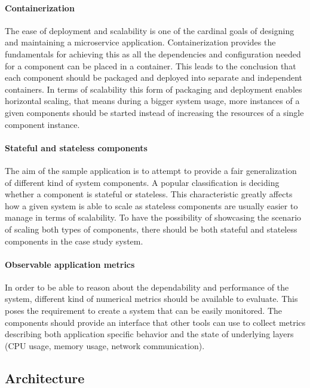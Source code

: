 \paragraph{Containerization}The ease of deployment and scalability is one of the cardinal goals of designing and maintaining a microservice application. Containerization provides the fundamentals for achieving this as all the dependencies and configuration needed for a component can be placed in a container. This leads to the conclusion that each component should be packaged and deployed into separate and independent containers.  In terms of scalability this form of packaging and deployment enables horizontal scaling, that means \eg during a bigger system usage, more instances of a given components should be started instead of increasing the resources of a single component instance.

\paragraph{Stateful and stateless components}The aim of the sample application is to attempt to provide a fair generalization of different kind of system components. A popular classification is deciding whether a component is stateful or stateless. This characteristic greatly affects how a given system is able to scale as stateless components are usually easier to manage in terms of scalability. To have the possibility of showcasing the scenario of scaling both types of components, there should be both stateful and stateless components in the case study system.

\paragraph{Observable application metrics}In order to be able to reason about the dependability and performance of the system, different kind of numerical metrics should be available to evaluate. This poses the requirement to create a system that can be easily monitored. The 
components should provide an interface that other tools can use to collect metrics describing both application specific behavior and the state of underlying layers (\eg CPU usage, memory usage, network communication).


\subsection{Architecture} \label{sample-app-arch}

